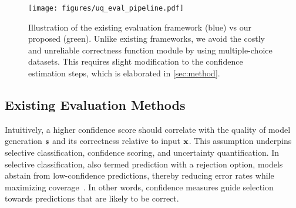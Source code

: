 \begin{figure*}[h]
    \centering
    \texttt{[image: figures/uq\_eval\_pipeline.pdf]}
    \caption{
    Illustration of the existing evaluation framework (blue) vs our proposed \uqeval (green).
    Unlike existing frameworks, we avoid the costly and unreliable correctness function module by using multiple-choice datasets.
    This requires slight modification to the confidence estimation steps, which is elaborated in \cref{sec:method}.
    }
    \label{fig:pipeline}
\end{figure*}






\subsection{Existing Evaluation Methods}\label{sec:prelim:old_eval}

Intuitively, a higher confidence score should correlate with the quality of model generation $\mathbf{s}$ and its correctness relative to input $\mathbf{x}$. 
This assumption underpins selective classification, confidence scoring, and uncertainty quantification. 
In selective classification, also termed prediction with a rejection option, models abstain from low-confidence predictions, thereby reducing error rates while maximizing coverage~\cite{JMLR:v24:21-0048,geifman2017selective}. 
In other words, confidence measures guide selection towards predictions that are likely to be correct.




